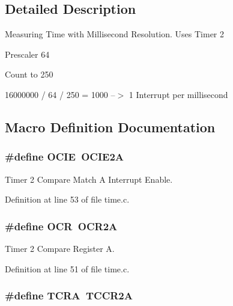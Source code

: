 \subsection{Detailed Description}
Measuring Time with Millisecond Resolution. Uses Timer 2

Prescaler 64

Count to 250

16000000 / 64 / 250 = 1000 --$>$ 1 Interrupt per millisecond 

\subsection{Macro Definition Documentation}
\hypertarget{group__time_ga28e96a5f5c13f26d2e4e4feae1e3c0fe}{
\subsubsection[{O\-C\-I\-E}]{\setlength{\rightskip}{0pt plus 5cm}\#define O\-C\-I\-E~O\-C\-I\-E2\-A}}\label{group__time_ga28e96a5f5c13f26d2e4e4feae1e3c0fe}


Timer 2 Compare Match A Interrupt Enable. 



Definition at line 53 of file time.\-c.

\hypertarget{group__time_gab38552082013ece744b4bff695e3b039}{
\subsubsection[{O\-C\-R}]{\setlength{\rightskip}{0pt plus 5cm}\#define O\-C\-R~O\-C\-R2\-A}}\label{group__time_gab38552082013ece744b4bff695e3b039}


Timer 2 Compare Register A. 



Definition at line 51 of file time.\-c.

\hypertarget{group__time_ga2d2fd1cec45bcf7874da25b8b5efff3c}{
\subsubsection[{T\-C\-R\-A}]{\setlength{\rightskip}{0pt plus 5cm}\#define T\-C\-R\-A~T\-C\-C\-R2\-A}}\label{group__time_ga2d2fd1cec45bcf7874da25b8b5efff3c}


